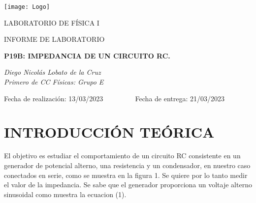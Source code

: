 \documentclass[article, 11pt]{report}
\begin{document}
	
	\begin{titlepage}
		\begin{center}
			\texttt{[image: Logo]}
		\end{center}
		
		\begin{center}
			
			
			{\scshape\Large LABORATORIO DE FÍSICA I \\ \par}
			\vspace{0.5cm}
			\vspace{2.5cm}
			{\scshape\Large INFORME DE LABORATORIO\\ \par}
			\vspace{0.5cm}
			{\Large\bfseries P19B: IMPEDANCIA DE UN CIRCUITO RC.
				\par}
			
			
			
			
			
			\vspace{1cm}
			{\itshape Diego Nicolás Lobato de la Cruz \\
				Primero de CC Físicas: Grupo E \par} 
			
			\vspace{0.5cm}
			
			Fecha de realización: 13/03/2023 ~~~~~~~~
			Fecha de entrega: 21/03/2023
			
		\end{center}
		
		\vspace{2cm}
		
		\tableofcontents
	\end{titlepage}
	
	\newpage
	
	
	\section{INTRODUCCIÓN TEÓRICA} \label{1.}
	
	El objetivo es estudiar el comportamiento de un circuito RC consistente en un generador de potencial alterno, una resistencia y un condensador, en nuestro caso conectados en serie, como se muestra en la figura 1. Se quiere por lo tanto medir el valor de la impedancia. Se sabe que el generador proporciona un voltaje alterno sinusoidal como muestra la ecuacion (1).
	
\end{document}
